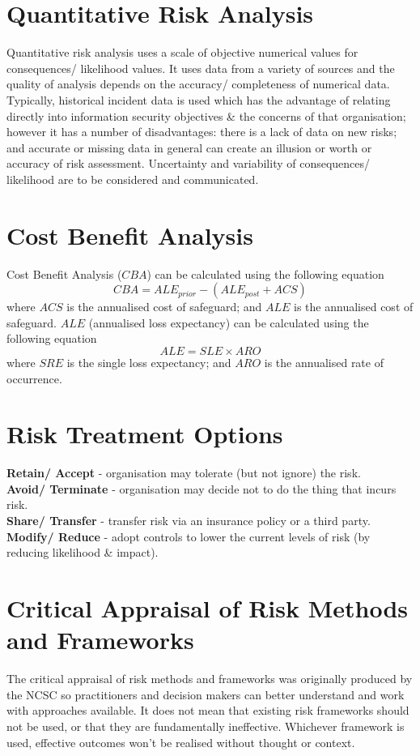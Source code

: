 \section*{Quantitative Risk Analysis}
Quantitative risk analysis uses a scale of objective numerical values for consequences/ likelihood values. It uses data from a variety of sources and the quality of analysis depends on the accuracy/ completeness of numerical data. Typically, historical incident data is used which has the advantage of relating directly into information security objectives \& the concerns of that organisation; however it has a number of disadvantages: there is a lack of data on new risks; and accurate or missing data in general can create an illusion or worth or accuracy of risk assessment. Uncertainty and variability of consequences/ likelihood are to be considered and communicated. 

\section*{Cost Benefit Analysis}
Cost Benefit Analysis ($CBA$) can be calculated using the following equation
\[CBA = ALE_{prior} - (ALE_{post} + ACS)\]
where $ACS$ is the annualised cost of safeguard; and $ALE$ is the annualised cost of safeguard. $ALE$ (annualised loss expectancy) can be calculated using the following equation
\[ALE = SLE \times ARO \]
where $SRE$ is the single loss expectancy; and $ARO$ is the annualised rate of occurrence.

\section*{Risk Treatment Options}
\textbf{Retain/ Accept} - organisation may tolerate (but not ignore) the risk.\\
\textbf{Avoid/ Terminate} - organisation may decide not to do the thing that incurs risk.\\
\textbf{Share/ Transfer} - transfer risk via an insurance policy or a third party.\\
\textbf{Modify/ Reduce} - adopt controls to lower the current levels of risk (by reducing likelihood \& impact). 

\section*{Critical Appraisal of Risk Methods and Frameworks}
The critical appraisal of risk methods and frameworks was originally produced by the NCSC so practitioners and decision makers can better understand and work with approaches available. It does not mean that existing risk frameworks should not be used, or that they are fundamentally ineffective. Whichever framework is used, effective outcomes won't be realised without thought or context. 
